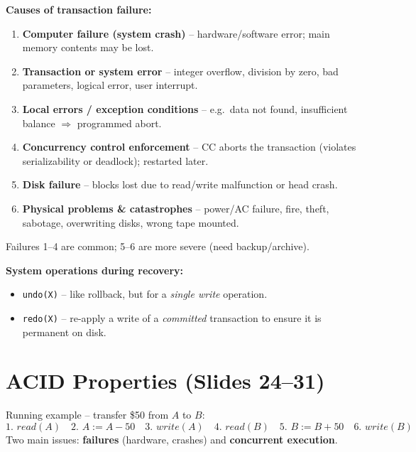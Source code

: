 \documentclass[10pt,a4paper]{article}
\newcommand{\op}[1]{\texttt{#1}}
\begin{document}
\textbf{Causes of transaction failure:}
\begin{enumerate}
  \item \textbf{Computer failure (system crash)} -- hardware/software error; main memory contents may be lost.
  \item \textbf{Transaction or system error} -- integer overflow, division by zero, bad parameters, logical error, user interrupt.
  \item \textbf{Local errors / exception conditions} -- e.g.\ data not found, insufficient balance $\Rightarrow$ programmed abort.
  \item \textbf{Concurrency control enforcement} -- CC aborts the transaction (violates serializability or deadlock); restarted later.
  \item \textbf{Disk failure} -- blocks lost due to read/write malfunction or head crash.
  \item \textbf{Physical problems \& catastrophes} -- power/AC failure, fire, theft, sabotage, overwriting disks, wrong tape mounted.
\end{enumerate}
Failures 1--4 are common; 5--6 are more severe (need backup/archive).

\textbf{System operations during recovery:}
\begin{itemize}
  \item \op{undo(X)} -- like rollback, but for a \emph{single write} operation.
  \item \op{redo(X)} -- re-apply a write of a \emph{committed} transaction to ensure it is permanent on disk.
\end{itemize}

\section{ACID Properties (Slides 24--31)}

Running example -- transfer \$50 from $A$ to $B$:
\[
\text{1. } read(A)\quad \text{2. } A := A-50\quad \text{3. } write(A)\quad \text{4. } read(B)\quad \text{5. } B := B+50\quad \text{6. } write(B)
\]
Two main issues: \textbf{failures} (hardware, crashes) and \textbf{concurrent execution}.
\end{document}
